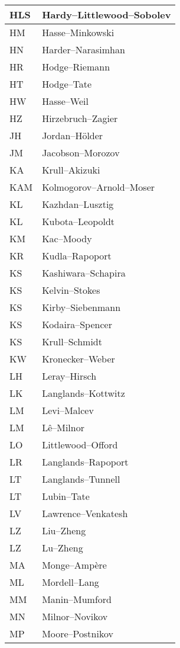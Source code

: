 \documentclass{amsart}
\numberwithin{equation}{section}
\theoremstyle{plain}
\numberwithin{equation}{section}
\theoremstyle{remark}
\begin{document}
\begin{longtable}{l|l}
HLS & Hardy--Littlewood--Sobolev\\ \hline
HM & Hasse--Minkowski\\ \hline
HN & Harder--Narasimhan\\ \hline
HR & Hodge--Riemann\\ \hline
HT & Hodge--Tate\\ \hline
HW & Hasse--Weil\\ \hline
HZ & Hirzebruch--Zagier\\ \hline
JH & Jordan--Hölder\\ \hline
JM & Jacobson--Morozov\\ \hline
KA & Krull--Akizuki\\ \hline
KAM & Kolmogorov--Arnold--Moser\\ \hline
KL & Kazhdan--Lusztig \\ \hline
KL & Kubota--Leopoldt\\ \hline
KM & Kac--Moody\\ \hline
KR & Kudla--Rapoport\\ \hline
KS & Kashiwara--Schapira\\ \hline
KS & Kelvin--Stokes\\ \hline
KS & Kirby--Siebenmann\\ \hline
KS & Kodaira--Spencer\\ \hline
KS & Krull--Schmidt\\ \hline
KW & Kronecker--Weber\\ \hline
LH & Leray--Hirsch\\ \hline
LK & Langlands--Kottwitz\\ \hline
LM & Levi--Malcev\\ \hline
LM & Lê--Milnor\\ \hline
LO & Littlewood--Offord\\ \hline
LR & Langlands--Rapoport\\ \hline
LT & Langlands--Tunnell\\ \hline
LT & Lubin--Tate\\ \hline
LV & Lawrence--Venkatesh\\ \hline
LZ & Liu--Zheng\\ \hline
LZ & Lu--Zheng\\ \hline
MA & Monge--Ampère\\ \hline
ML & Mordell--Lang\\ \hline
MM & Manin--Mumford\\ \hline
MN & Milnor--Novikov\\ \hline
MP & Moore--Postnikov\\ \hline

\end{longtable}
\end{document}
